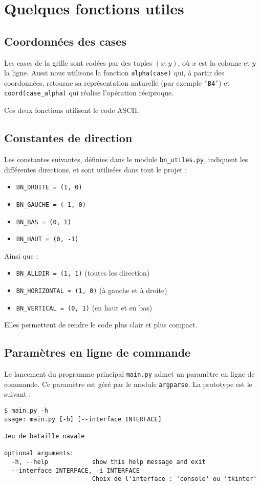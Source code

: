 \chapter{Quelques fonctions utiles}

\section{Coordonnées des cases}
Les cases de la grille sont codées par des tuples $(x,y)$, où $x$ est la colonne et $y$ la ligne. Aussi nous utilisons la fonction \texttt{alpha(case)} qui, à partir des coordonnées, retourne sa représentation naturelle (par exemple \texttt{'B4'}) et \texttt{coord(case\_alpha)} qui réalise l'opération réciproque.

Ces deux fonctions utilisent le code ASCII.

\section{Constantes de direction}
Les constantes suivantes, définies dans le module \texttt{bn\_utiles.py}, indiquent les différentes directions, et sont utilisées dans tout le projet :
\begin{itemize}
\item \texttt{BN\_DROITE = (1, 0)}
\item \texttt{BN\_GAUCHE = (-1, 0)}
\item \texttt{BN\_BAS = (0, 1)}
\item \texttt{BN\_HAUT = (0, -1)}
\end{itemize}
Ainsi que :
\begin{itemize}
\item \texttt{BN\_ALLDIR = (1, 1)} (toutes les direction)
\item \texttt{BN\_HORIZONTAL = (1, 0)} (à gauche et à droite)
\item \texttt{BN\_VERTICAL = (0, 1)} (en haut et en bas)
\end{itemize}
Elles permettent de rendre le code plus clair et plus compact.

\section{Paramètres en ligne de commande}
Le lancement du programme principal \texttt{main.py} admet un paramètre en ligne de commande. Ce paramètre est géré par le module \texttt{argparse}. La prototype est le suivant :

\begin{verbatim}
$ main.py -h
usage: main.py [-h] [--interface INTERFACE]

Jeu de bataille navale

optional arguments:
  -h, --help            show this help message and exit
  --interface INTERFACE, -i INTERFACE
                        Choix de l'interface : 'console' ou 'tkinter'
\end{verbatim}